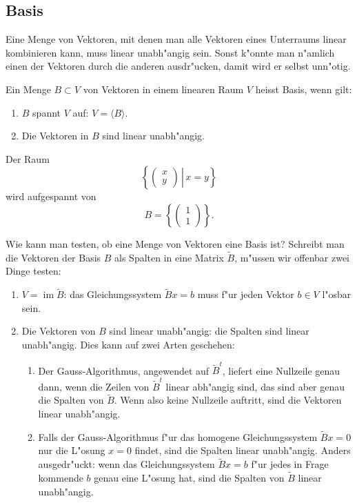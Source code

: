 \subsection{Basis}
Eine Menge von Vektoren, mit denen man alle Vektoren eines Unterraums
linear kombinieren kann, muss linear unabh"angig sein. Sonst k"onnte
man n"amlich einen der Vektoren durch die anderen ausdr"ucken, damit
wird er selbst unn"otig. 

\begin{definition}
Ein Menge $B\subset V$ von Vektoren in einem linearen Raum $V$ heisst
Basis, wenn gilt:
\begin{enumerate}
\item $B$ spannt $V$ auf: $V=\langle B\rangle$.
\item Die Vektoren in $B$ sind linear unabh"angig.
\end{enumerate}
\end{definition}

\begin{beispiel}
Der Raum
\[
\left\{\left.\begin{pmatrix}x\\y\end{pmatrix}\,\right|\, x=y\right\}
\]
wird aufgespannt von 
\[
B=\left\{\begin{pmatrix}1\\1\end{pmatrix}\right\}.
\]
\end{beispiel}

Wie kann man testen, ob eine Menge von Vektoren eine Basis ist?
Schreibt man die Vektoren der Basis $B$ als Spalten in eine Matrix
$\tilde B$, m"ussen wir offenbar zwei Dinge testen:
\begin{enumerate}
\item $V = \operatorname{im}\tilde B$: das Gleichungssystem $\tilde Bx=b$
muss f"ur jeden Vektor $b\in V$ l"osbar sein.
\item Die Vektoren von $B$ sind linear unabh"angig: die Spalten sind
linear unabh"angig. Dies kann auf zwei Arten geschehen:
\begin{enumerate}
\item Der Gauss-Algorithmus, angewendet auf $\tilde B^t$, liefert eine
Nullzeile genau dann, wenn die Zeilen von $\tilde B^t$ linear abh"angig sind,
das sind aber genau die Spalten von $\tilde B$. Wenn also keine Nullzeile
auftritt, sind die Vektoren linear unabh"angig.
\item Falls der Gauss-Algorithmus f"ur das homogene Gleichungssystem
$\tilde B x=0$ nur die L"osung $x=0$ findet, sind die Spalten linear
unabh"angig. Anders ausgedr"uckt: wenn das Gleichungssystem $\tilde Bx=b$
f"ur jedes in Frage kommende $b$ genau eine L"osung hat, sind die
Spalten von $\tilde B$ linear unabh"angig.
\end{enumerate}
\end{enumerate}



